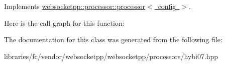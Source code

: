 Implements \mbox{\hyperlink{classwebsocketpp_1_1processor_1_1processor_ab5bc7b8f480ee28049f44232115bcaab}{websocketpp\+::processor\+::processor$<$ config $>$}}.

Here is the call graph for this function\+:


The documentation for this class was generated from the following file\+:\begin{DoxyCompactItemize}
\item 
libraries/fc/vendor/websocketpp/websocketpp/processors/hybi07.\+hpp\end{DoxyCompactItemize}
